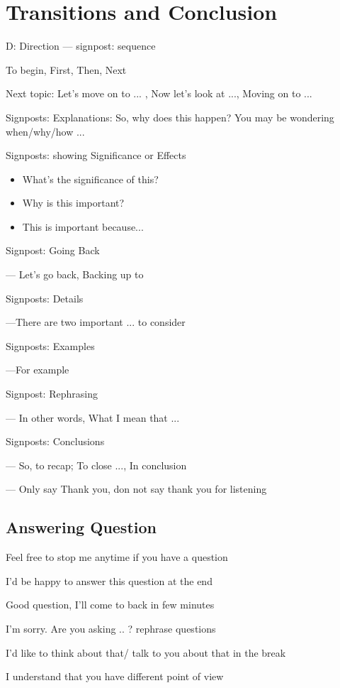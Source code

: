\documentclass{article}
\begin{document}
\section{Transitions and Conclusion}

D: Direction --- signpost: sequence

To begin, First, Then, Next

Next topic: Let's move on to ... , Now let's look at ..., Moving on to ...

Signposts: Explanations:  So, why does this happen? You may be wondering when/why/how ...

Signposts: showing Significance or Effects
\begin{itemize}
\item{What's the significance of this?}
\item{Why is this important?}
\item{This is important because...}
\end{itemize}

Signpost: Going Back

--- Let's go back, Backing up to

Signposts: Details

---There are two important ... to consider

Signposts: Examples

---For example

Signpost: Rephrasing

--- In other words, What I mean that ...

Signposts: Conclusions

--- So, to recap; To close ..., In conclusion

--- Only say Thank you, don not say thank you for listening

\subsection{Answering Question}

Feel free to stop me anytime if you have a question

I'd be happy to answer this question at the end

Good question, I'll come to back in few minutes

I'm sorry. Are you asking .. ? rephrase questions

I'd like to think about that/ talk to you about that in the break

I understand that you have different point of view
\end{document}
